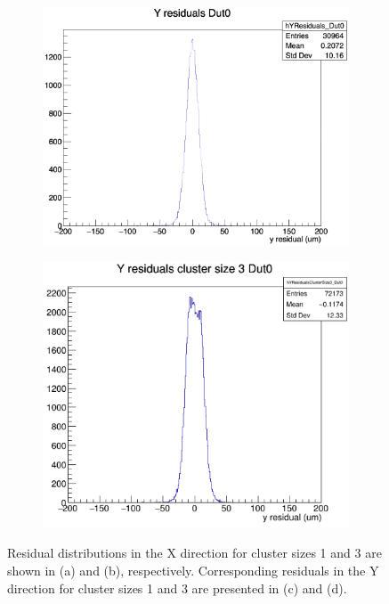 \begin{figure}[H]
    \vspace{0.5cm}

    \begin{subfigure}[t]{0.5\textwidth}
        \centering
        \includegraphics[width=\textwidth]{images/YRes_13planes.png}
        \caption{}
        \label{fig:dist_c}
    \end{subfigure}
    \hfill
    \begin{subfigure}[t]{0.45\textwidth}
        \centering
        \includegraphics[width=\textwidth]{images/YRes_size3.png}
        \caption{}
        \label{fig:dist_d}
    \end{subfigure}

    \caption{Residual distributions in the X direction for cluster sizes 1 and 3 are shown in (a) and (b), respectively. Corresponding residuals in the Y direction for cluster sizes 1 and 3 are presented in (c) and (d).}
    \label{fig:resolution_size_1&3}
\end{figure}


